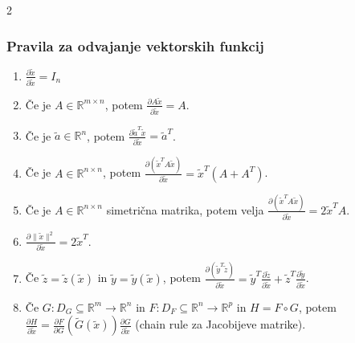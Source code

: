 \documentclass{article}
\begin{document}
\begin{multicols}{2}
	\subsubsection{Pravila za odvajanje vektorskih funkcij}

	\begin{enumerate}
		\item \(\frac{\partial \tilde{x}}{\partial \tilde{x}} = I_n\)
		\item Če je \( A \in \mathbb{R}^{m \times n} \), potem \( \frac{\partial A\tilde{x}}{\partial \tilde{x}} = A \).
		\item Če je \( \tilde{a} \in \mathbb{R}^n \), potem \( \frac{\partial \tilde{a}^T\tilde{x}}{\partial \tilde{x}} = \tilde{a}^T \).
		\item Če je \( A \in \mathbb{R}^{n \times n} \), potem \( \frac{\partial (\tilde{x}^T A\tilde{x})}{\partial \tilde{x}} = \tilde{x}^T(A + A^T) \).
		\item Če je \( A \in \mathbb{R}^{n \times n} \) simetrična matrika, potem velja \( \frac{\partial (\tilde{x}^T A\tilde{x})}{\partial \tilde{x}} = 2\tilde{x}^T A \).
		\item \( \frac{\partial \|\tilde{x}\|^2}{\partial \tilde{x}} = 2\tilde{x}^T \).
		\item Če \( \tilde{z} = \tilde{z}(\tilde{x}) \) in \( \tilde{y} = \tilde{y}(\tilde{x}) \), potem \( \frac{\partial (\tilde{y}^T \tilde{z})}{\partial \tilde{x}} = \tilde{y}^T \frac{\partial \tilde{z}}{\partial \tilde{x}} + \tilde{z}^T \frac{\partial \tilde{y}}{\partial \tilde{x}} \).
		\item Če \( G: D_G \subseteq \mathbb{R}^m \rightarrow \mathbb{R}^n \) in \( F: D_F \subseteq \mathbb{R}^n \rightarrow \mathbb{R}^p \) in \( H = F \circ G \), potem \( \frac{\partial H}{\partial \tilde{x}} = \frac{\partial F}{\partial G} (\tilde{G}(\tilde{x})) \frac{\partial G}{\partial \tilde{x}} \) (chain rule za Jacobijeve matrike).
	\end{enumerate}


\end{multicols}
\end{document}
